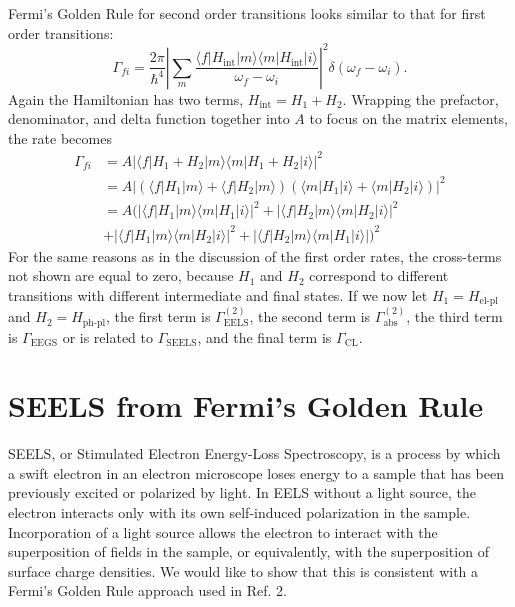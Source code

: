 \documentclass [11pt, proquest] {uwthesis}[2016/11/22]
\begin{document}
Fermi's Golden Rule for second order transitions looks similar to that for first order transitions:
\begin{equation}
\Gamma_{fi} = \frac{2\pi}{\hbar^4}\left|\sum_{m}\frac{\langle f |H_{\textrm{int}}| m \rangle \langle m |H_{\textrm{int}}| i \rangle }{\omega_f-\omega_i}\right|^2 \delta(\omega_f - \omega_i).
\label{FGR_2}
\end{equation}
Again the Hamiltonian has two terms, $H_{\textrm{int}} = H_1 + H_2$. Wrapping the prefactor, denominator, and delta function together into $A$ to focus on the matrix elements, the rate becomes
\begin{equation}
\begin{aligned}
\Gamma_{fi} &= A|\langle f |H_1 + H_2| m \rangle \langle m |H_1 + H_2| i \rangle|^2\\
&= A|(\langle f |H_1| m \rangle + \langle f |H_2| m \rangle) (\langle m |H_1| i \rangle + \langle m |H_2| i \rangle)|^2\\
&= A(|\langle f |H_1| m \rangle \langle m |H_1| i \rangle|^2 + |\langle f |H_2| m \rangle \langle m |H_2| i \rangle|^2\\
&+ |\langle f |H_1| m \rangle \langle m |H_2| i \rangle|^2 + |\langle f |H_2| m \rangle \langle m |H_1| i \rangle|)^2
\label{FGR_2_2}
\end{aligned}
\end{equation}
For the same reasons as in the discussion of the first order rates, the cross-terms not shown are equal to zero, because $H_1$ and $H_2$ correspond to different transitions with different intermediate and final states. If we now let $H_1 = H_\textrm{el-pl}$ and $H_2 = H_{\textrm{ph-pl}}$, the first term is $\Gamma_{\textrm{EELS}}^{(2)}$, the second term is $\Gamma_{\textrm{abs}}^{(2)}$, the third term is $\Gamma_{\textrm{EEGS}}$ or is related to $\Gamma_{\textrm{SEELS}}$, and the final term is $\Gamma_{\textrm{CL}}$.

\section{SEELS from Fermi's Golden Rule}
SEELS, or Stimulated Electron Energy-Loss Spectroscopy, is a process by which a swift electron in an electron microscope loses energy to a sample that has been previously excited or polarized by light. In EELS without a light source, the electron interacts only with its own self-induced polarization in the sample. Incorporation of a light source allows the electron to interact with the superposition of fields in the sample, or equivalently, with the superposition of surface charge densities. We would like to show that this is consistent with a Fermi's Golden Rule approach used in Ref. 2.
\end{document}
